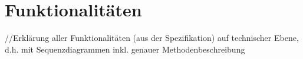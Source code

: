 \chapter{Funktionalitäten}

//Erklärung aller Funktionalitäten (aus der Spezifikation) auf technischer Ebene, d.h. mit Sequenzdiagrammen inkl. genauer Methodenbeschreibung
